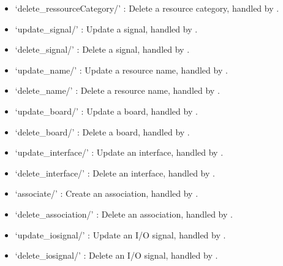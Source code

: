 \documentclass[letterpaper,10pt,english]{sphinxmanual}
\begin{document}
\begin{description}
\begin{itemize}
\item {} 
\sphinxAtStartPar
‘delete\_ressourceCategory/’ : Delete a resource category, handled by .

\item {} 
\sphinxAtStartPar
‘update\_signal/’ : Update a signal, handled by .

\item {} 
\sphinxAtStartPar
‘delete\_signal/’ : Delete a signal, handled by .

\item {} 
\sphinxAtStartPar
‘update\_name/’ : Update a resource name, handled by .

\item {} 
\sphinxAtStartPar
‘delete\_name/’ : Delete a resource name, handled by .

\item {} 
\sphinxAtStartPar
‘update\_board/’ : Update a board, handled by .

\item {} 
\sphinxAtStartPar
‘delete\_board/’ : Delete a board, handled by .

\item {} 
\sphinxAtStartPar
‘update\_interface/’ : Update an interface, handled by .

\item {} 
\sphinxAtStartPar
‘delete\_interface/’ : Delete an interface, handled by .

\item {} 
\sphinxAtStartPar
‘associate/’ : Create an association, handled by .

\item {} 
\sphinxAtStartPar
‘delete\_association/’ : Delete an association, handled by .

\item {} 
\sphinxAtStartPar
‘update\_iosignal/’ : Update an I/O signal, handled by .

\item {} 
\sphinxAtStartPar
‘delete\_iosignal/’ : Delete an I/O signal, handled by .


\end{itemize}
\end{description}
\end{document}
